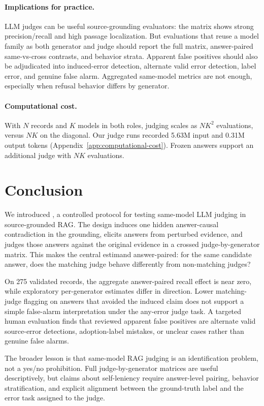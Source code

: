 \paragraph{Implications for practice.}
LLM judges can be useful source-grounding evaluators: the matrix shows strong precision/recall and high passage localization. But evaluations that reuse a model family as both generator and judge should report the full matrix, answer-paired same-vs-cross contrasts, and behavior strata. Apparent false positives should also be adjudicated into induced-error detection, alternate valid error detection, label error, and genuine false alarm. Aggregated same-model metrics are not enough, especially when refusal behavior differs by generator.

\paragraph{Computational cost.}
With $N$ records and $K$ models in both roles, judging scales as $NK^2$ evaluations, versus $NK$ on the diagonal. Our judge runs recorded 5.63M input and 0.31M output tokens (Appendix~\ref{app:computational-cost}). Frozen answers support an additional judge with $NK$ evaluations.


\section{Conclusion}

We introduced \method, a controlled protocol for testing same-model LLM judging in source-grounded RAG. The design induces one hidden answer-causal contradiction in the grounding, elicits answers from perturbed evidence, and judges those answers against the original evidence in a crossed judge-by-generator matrix. This makes the central estimand answer-paired: for the same candidate answer, does the matching judge behave differently from non-matching judges?

On 275 validated records, the aggregate answer-paired recall effect is near zero, while exploratory per-generator estimates differ in direction. Lower matching-judge flagging on answers that avoided the induced claim does not support a simple false-alarm interpretation under the any-error judge task. A targeted human evaluation finds that reviewed apparent false positives are alternate valid source-error detections, adoption-label mistakes, or unclear cases rather than genuine false alarms.

The broader lesson is that same-model RAG judging is an identification problem, not a yes/no prohibition. Full judge-by-generator matrices are useful descriptively, but claims about self-leniency require answer-level pairing, behavior stratification, and explicit alignment between the ground-truth label and the error task assigned to the judge.


